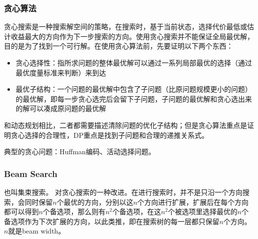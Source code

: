 \subsubsection{贪心算法}
贪心搜索是一种搜索解空间的策略，在搜索时，基于当前状态，选择代价最低或估计收益最大的方向作为下一步搜索的方向。使用贪心搜索并不能保证全局最优解，目的是为了找到一个可行解。在使用贪心算法前，先要证明以下两个东西：
\begin{itemize}
	\item 贪心选择性：指所求问题的整体最优解可以通过一系列局部最优的选择（通过最优度量标准来判断）来到达
	\item 最优子结构：一个问题的最优解中包含了子问题（比原问题规模更小的问题）的最优解，即每一步贪心选完后会留下子问题，子问题的最优解和贪心选出来的解可以凑成原问题的最优解
\end{itemize}
和动态规划相比，二者都需要描述清除问题的优化子结构；但是贪心算法重点是证明贪心选择的合理性，DP重点是找到子问题和合理的递推关系式。

典型的贪心问题：Huffman编码、活动选择问题。



\subsubsection{Beam Search}
也叫集束搜索。
对贪心搜索的一种改进。在进行搜索时，并不是只沿一个方向搜索，会同时保留$n$个最优的方向，分别以这$n$个方向进行扩展，扩展后在每个方向都可以得到$n$个备选项，那么则有$n^2$个备选项，在这$n^2$个被选项里选择最优的$n$个备选项作为下次扩展的方向，以此类推，即在搜索树的每一层都只保留$n$个方向。$n$就是beam width。
